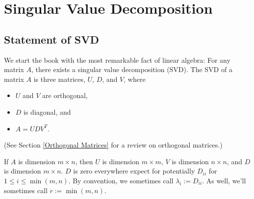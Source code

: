 \documentclass{amsbook}
\begin{document}
\chapter{Singular Value Decomposition}
\section{Statement of SVD}

We start the book with the most remarkable fact of linear algebra:  For any matrix $A$, there exists a singular value decomposition (SVD).  The SVD of a matrix $A$ is three matrices, $U$, $D$, and $V$, where

\begin{itemize}
	\item $U$ and $V$ are orthogonal,
	\item $D$ is diagonal, and
	\item $A=UDV^T$.
\end{itemize}

(See Section \ref{Orthogonal Matrices} for a review on orthogonal matrices.)

If $A$ is dimension $m\times n$, then $U$ is dimension $m\times m$, $V$ is dimension $n\times n$, and $D$ is dimension $m\times n$.  $D$ is zero everywhere expect for potentially $D_{ii}$ for $1\leq i\leq\min(m, n)$.  By convention, we sometimes call $\lambda_i:=D_{ii}$.  As well, we'll sometimes call $r:=\min(m, n)$.
\end{document}
